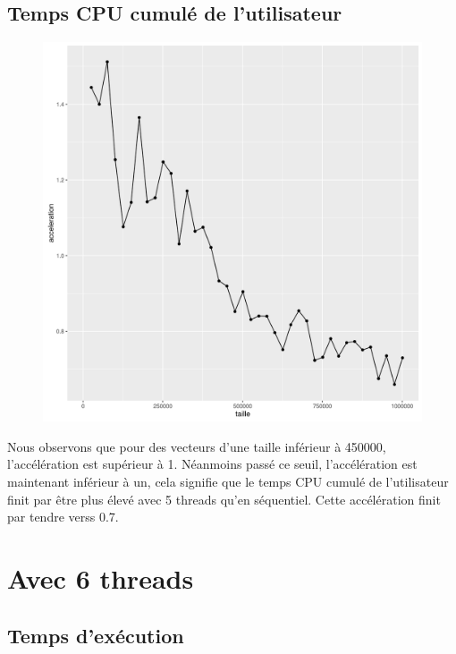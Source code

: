 \documentclass[a4paper,11pt]{scrartcl}
\begin{document}
\subsection{Temps CPU cumul\'e de l'utilisateur}
\begin{figure}[H] \center
   \includegraphics[scale=0.5] {graphes/temps_user_accel5.png}
\end{figure}
Nous observons que pour des vecteurs d'une taille inf\'erieur \`a 450000, l'acc\'el\'eration est sup\'erieur \`a 1. N\'eanmoins pass\'e ce seuil,  l'acc\'el\'eration est maintenant inf\'erieur \`a un, cela signifie que le temps CPU cumul\'e de l'utilisateur finit par \^{e}tre plus \'elev\'e avec 5 threads qu'en s\'equentiel. Cette acc\'el\'eration finit par tendre verss 0.7.


\section{Avec 6 threads}
\subsection{Temps d'ex\'ecution}
\end{document}
